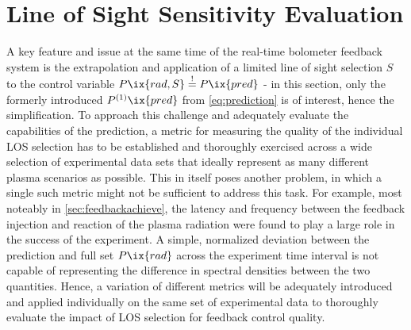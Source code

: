     \section{Line of Sight Sensitivity Evaluation}\label{sec:evalmetrics}%
%
        A key feature and issue at the same time of the real-time bolometer feedback system is the extrapolation and application of a limited line of sight selection $S$ to the control variable $P\ix{rad,S}\overset{!}{=}P\ix{pred}$ - in this section, only the formerly introduced $P^{\text{(1)}}\ix{pred}$ from \cref{eq:prediction} is of interest, hence the simplification. To approach this challenge and adequately evaluate the capabilities of the prediction, a metric for measuring the quality of the individual LOS selection has to be established and thoroughly exercised across a wide selection of experimental data sets that ideally represent as many different plasma scenarios as possible. This in itself poses another problem, in which a single such metric might not be sufficient to address this task. For example, most noteably in \cref{sec:feedbackachieve}, the latency and frequency between the feedback injection and reaction of the plasma radiation were found to play a large role in the success of the experiment. A simple, normalized deviation between the prediction and full set $P\ix{rad}$ across the experiment time interval is not capable of representing the difference in spectral densities between the two quantities. Hence, a variation of different metrics will be adequately introduced and applied individually on the same set of experimental data to thoroughly evaluate the impact of LOS selection for feedback control quality.%
%
